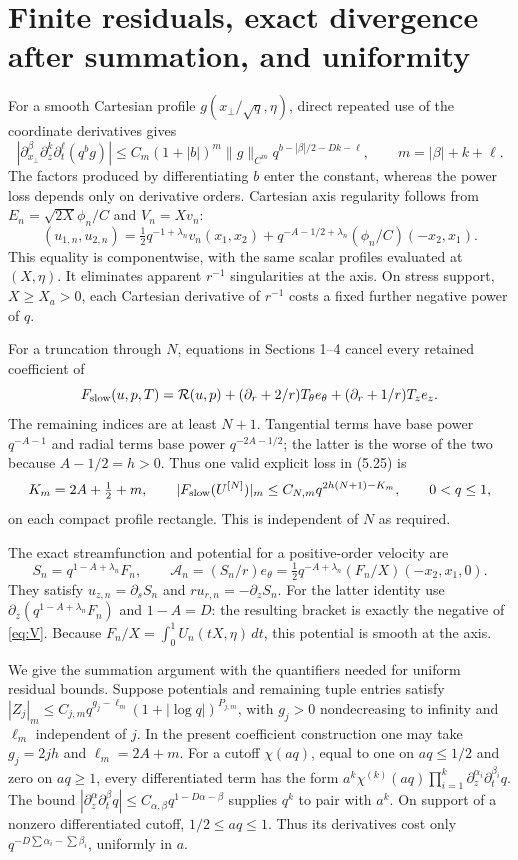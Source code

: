 \documentclass[10pt,a4paper]{article}
\newcommand{\res}{\mathcal R}
\begin{document}
\section{Finite residuals, exact divergence after summation, and uniformity}
For a smooth Cartesian profile $g(x_\perp/\sqrt q,\eta)$, direct repeated use
of the coordinate derivatives gives
\[
|\partial_{x_\perp}^{\beta}\partial_z^k\partial_t^\ell(q^bg)|
\le C_m(1+|b|)^m\|g\|_{C^m}
q^{b-|\beta|/2-Dk-\ell},\qquad m=|\beta|+k+\ell.
\]
The factors produced by differentiating $b$ enter the constant, whereas the
power loss depends only on derivative orders. Cartesian axis regularity follows
from $E_n=\sqrt{2X}\phi_n/C$ and $V_n=Xv_n$:
\[
(u_{1,n},u_{2,n})=
\tfrac12q^{-1+\lambda_n}v_n(x_1,x_2)
+q^{-A-1/2+\lambda_n}(\phi_n/C)(-x_2,x_1).
\]
This equality is componentwise, with the same scalar profiles evaluated at
$(X,\eta)$. It eliminates apparent $r^{-1}$ singularities at the axis.
On stress support, $X\ge X_a>0$, each Cartesian derivative of $r^{-1}$ costs
a fixed further negative power of $q$.

For a truncation through $N$, equations in Sections 1--4 cancel every retained
coefficient of
\[
F_{\rm slow}(u,p,T)=\res(u,p)
+(\partial_r+2/r)T_\theta e_\theta+(\partial_r+1/r)T_ze_z.
\]
The remaining indices are at least $N+1$. Tangential terms have base power
$q^{-A-1}$ and radial terms base power $q^{-2A-1/2}$; the latter is the worse
of the two because $A-1/2=h>0$. Thus one valid explicit loss in (5.25) is
\[
 K_m=2A+\tfrac12+m,
\qquad |F_{\rm slow}(U^{[N]})|_m
 \le C_{N,m}q^{2h(N+1)-K_m},\qquad0<q\le1,
\]
on each compact profile rectangle. This is independent of $N$ as required.

The exact streamfunction and potential for a positive-order velocity are
\[
S_n=q^{1-A+\lambda_n}F_n,\qquad
\mathcal A_n=(S_n/r)e_\theta
=\tfrac12q^{-A+\lambda_n}(F_n/X)(-x_2,x_1,0).
\]
They satisfy $u_{z,n}=\partial_sS_n$ and $ru_{r,n}=-\partial_zS_n$.
For the latter identity use $\partial_z(q^{1-A+\lambda_n}F_n)$ and
$1-A=D$: the resulting bracket is exactly the negative of \eqref{eq:V}.
Because $F_n/X=\int_0^1U_n(tX,\eta)\,dt$, this potential is smooth at the axis.

We give the summation argument with the quantifiers needed for uniform residual
bounds. Suppose potentials and remaining tuple entries satisfy
$|Z_j|_m\le C_{j,m}q^{g_j-\ell_m}(1+|\log q|)^{P_{j,m}}$, with
$g_j>0$ nondecreasing to infinity and $\ell_m$ independent of $j$.
In the present coefficient construction one may take $g_j=2jh$ and
$\ell_m=2A+m$. For a cutoff $\chi(aq)$, equal to one on $aq\le1/2$ and
zero on $aq\ge1$, every differentiated term has the form
$a^k\chi^{(k)}(aq)\prod_{i=1}^k\partial_z^{\alpha_i}\partial_t^{\beta_i}q$.
The bound $|\partial_z^\alpha\partial_t^\beta q|
\le C_{\alpha,\beta}q^{1-D\alpha-\beta}$ supplies $q^k$ to pair with $a^k$.
On support of a nonzero differentiated cutoff, $1/2\le aq\le1$.
Thus its derivatives cost only $q^{-D\sum\alpha_i-\sum\beta_i}$, uniformly
in $a$.
\end{document}
